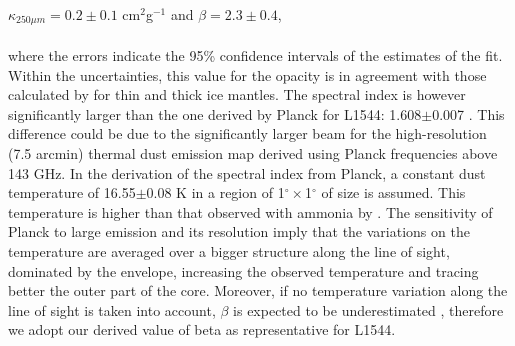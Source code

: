\documentclass{aa}
\begin{document}
$\kappa_{250\mu m} = 0.2 \pm 0.1$ cm$^2$g$^{-1}$ and $\beta=2.3 \pm 0.4$,
\\
\\
where the errors indicate the 95\% confidence intervals of the estimates of the fit. Within the uncertainties, this value for the opacity is in agreement with those calculated by  for thin and thick ice mantles. The spectral index is however significantly larger than the one derived by Planck for L1544: 1.608$\pm$0.007 . This difference could be due to the significantly larger beam for the high-resolution (7.5 arcmin) thermal dust emission map derived using Planck frequencies above 143 GHz. In the derivation of the spectral index from Planck, a constant dust temperature of 16.55$\pm$0.08 K in a region of 1$^{\circ}\times$1$^{\circ}$ of size is assumed. This temperature is higher than that observed with ammonia by . The sensitivity of Planck to large emission and its resolution imply that the variations on the temperature are averaged over a bigger structure along the line of sight, dominated by the envelope,  increasing the observed temperature and tracing better the outer part of the core. Moreover, if no temperature variation along the line of sight is taken into account, $\beta$ is expected to be underestimated , therefore we adopt our derived value of beta as representative for L1544. 
\end{document}
